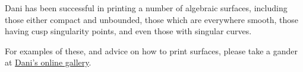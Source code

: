 Dani has been successful in printing a number of algebraic surfaces, including those either compact and unbounded, those which are everywhere
smooth, those having cusp singularity points, and even those with singular
curves.

For examples of these, and advice on how to print surfaces, please take a gander at \href{http://www.danielthebrake.org/gallery/}{Dani's online gallery}.

